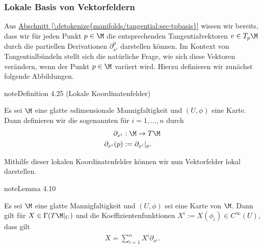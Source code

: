 \documentclass[letterpaper,10pt,german]{jupyterBook}
\begin{document}
\subsubsection{Lokale Basis von Vektorfeldern}
\label{\detokenize{manifolds/tangential:lokale-basis-von-vektorfeldern}}
\sphinxAtStartPar
Aus \hyperref[\detokenize{manifolds/tangential:sec-tpbasis}]{Abschnitt \ref{\detokenize{manifolds/tangential:sec-tpbasis}}} wissen wir bereits, dass wir für jeden Punkt \(p\in\M\) die entsprechenden Tangentialvektoren \(v\in T_p\M\) durch die partiellen Derivationen \(\partial_{x^i}^p\) darstellen können.
Im Kontext von Tangentialbündeln stellt sich die natürliche Frage, wie sich diese Vektoren verändern, wenn der Punkt \(p\in\M\) variiert wird.
Hierzu definieren wir zunächst folgende Abbildungen.
\label{manifolds/tangential:definition-32}
\begin{sphinxadmonition}{note}{Definition 4.25 (Lokale Koordinatenfelder)}



\sphinxAtStartPar
Es sei \(\M\) eine glatte \(n\)\sphinxhyphen{}dimensionale Mannigfaltigkeit und \((U,\phi)\) eine Karte.
Dann definieren wir die sogenannten  für \(i=1,\ldots,n\) durch
\begin{equation*}
\begin{split}\partial_{x^{i}}&:\M\to T\M\\
\partial_{x^{i}}(p)&:= \partial_{x^{i}}\rvert_p. \end{split}
\end{equation*}\end{sphinxadmonition}

\sphinxAtStartPar
Mithilfe dieser lokalen Koordinatenfelder können wir nun Vektorfelder lokal darstellen.
\label{manifolds/tangential:lem:localsections}
\begin{sphinxadmonition}{note}{Lemma 4.10}



\sphinxAtStartPar
Es sei \(\M\) eine glatte Mannigfaltigkeit und \((U,\phi)\) sei eine Karte von \(\M\).
Dann gilt für \(X\in\Gamma(T\M\rvert_U)\) und die Koeffizientenfunktionen \(X^i:=X(\phi_i)\in C^\infty(U)\), dass gilt
\begin{equation*}
\begin{split}X = \sum_{i=1}^n X^i \partial_{x^{i}}.\end{split}
\end{equation*}\end{sphinxadmonition}
\end{document}

